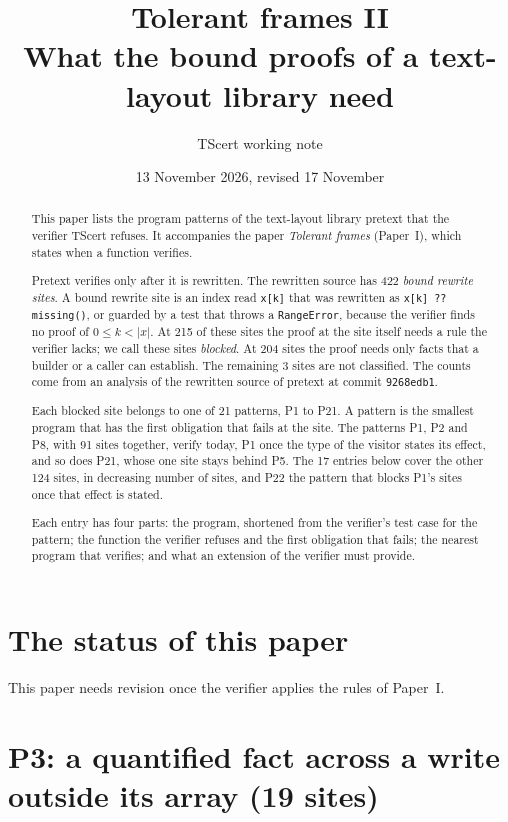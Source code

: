 \documentclass[10pt,a4paper]{article}
\title{Tolerant frames II\\[2pt]\large What the bound proofs of a text-layout library need}
\author{TScert working note}
\date{13 November 2026, revised 17 November}
\theoremstyle{definition}
\theoremstyle{remark}
\newcommand{\len}[1]{|#1|}
\newcommand{\code}[1]{\texttt{#1}}
\begin{document}
\maketitle

\begin{abstract}
\noindent
This paper lists the program patterns of the text-layout library
pretext that the verifier TScert refuses. It accompanies the paper
\emph{Tolerant frames} (Paper~I), which states when a function
verifies.

Pretext verifies only after it is rewritten. The rewritten source has
422 \emph{bound rewrite sites}. A bound rewrite site is an index read
\code{x[k]} that was rewritten as \code{x[k] ?? missing()}, or guarded
by a test that throws a \code{RangeError}, because the verifier finds
no proof of $0\le k<\len x$. At 215 of these sites the proof at the
site itself needs a rule the verifier lacks; we call these sites
\emph{blocked}. At 204 sites the proof needs only facts that a builder
or a caller can establish. The remaining 3 sites are not classified.
The counts come from an analysis of the rewritten source of pretext at
commit \code{9268edb1}.

Each blocked site belongs to one of 21 patterns, P1 to P21. A pattern
is the smallest program that has the first obligation that fails at the
site. The patterns P1, P2 and P8, with 91 sites together, verify today,
P1 once the type of the visitor states its effect, and so does P21, whose
one site stays behind P5. The 17 entries below cover the other 124
sites, in decreasing number of sites, and P22 the pattern that blocks
P1's sites once that effect is stated.

Each entry has four parts: the program, shortened from the verifier's
test case for the pattern; the function the verifier refuses and the
first obligation that fails; the nearest program that verifies; and
what an extension of the verifier must provide.
\end{abstract}

\section*{The status of this paper}

This paper needs revision once the verifier applies the rules of
Paper~I.

\section{P3: a quantified fact across a write outside its array (19 sites)}
\end{document}

